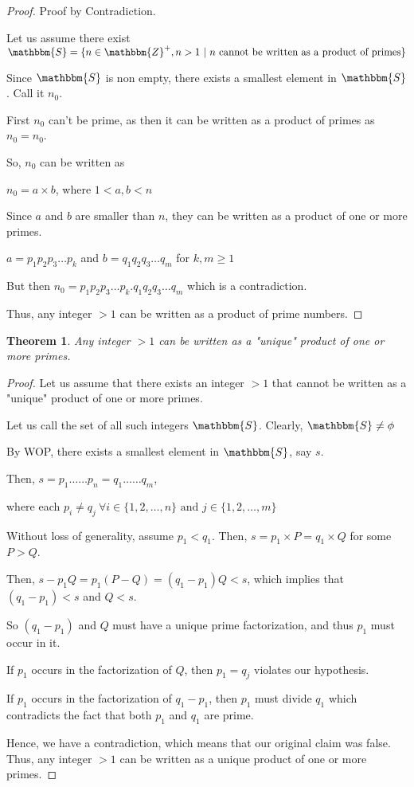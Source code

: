 \documentclass[14pt]{extarticle}
\newcommand{\Z}{\mathbbm{Z}}
\newcommand{\Sset}{\mathbbm{S}}
\newtheorem{theorem}{Theorem}
\begin{document}
\begin{proof}
    Proof by Contradiction.

    Let us assume there exist \\ 
    $\Sset = \{ n\in \Z^+, n > 1 \ | \ n \text{ cannot be written as a product of primes} \}$

    Since $\Sset$ is non empty, there exists a smallest element in $\Sset$. Call it $n_0$.

    First $n_0$ can't be prime, as then it can be written as a product of primes as $n_0 = n_0$.

    So, $n_0$ can be written as

    $n_0 = a\times b$, where $1 < a, b < n$

    Since $a$ and $b$ are smaller than $n$, they can be written as a product of one or more primes.

    $a = p_1p_2p_3\dots p_k$ and $b = q_1q_2q_3\dots q_m$ for $k,m \geq 1$

    But then $n_0 = p_1p_2p_3\dots p_k.q_1q_2q_3\dots q_m$ which is a contradiction.

    Thus, any integer $> 1$ can be written as a product of prime numbers.
\end{proof}

\begin{theorem}
    Any integer $> 1$ can be written as a "unique" product of one or more primes.
\end{theorem}

\begin{proof}
    Let us assume that there exists an integer $ > 1$ that cannot be written as a "unique" product of one or more primes.

    Let us call the set of all such integers $\Sset$.
    Clearly, $\Sset \neq \phi$

    By WOP, there exists a smallest element in $\Sset$, say $s$.

    Then, $s = p_1\dots\dots p_n = q_1\dots\dots q_m$, 
    
    where each $p_i \neq q_j \ \forall i \in \{1, 2, \dots, n\} \text{ and } j \in \{1, 2, \dots, m\}$

    Without loss of generality, assume $p_1 < q_1$.
    Then, $s = p_1 \times P = q_1 \times Q$ for some $P > Q$.

    Then, $s - p_1Q = p_1 (P-Q) = (q_1 - p_1)Q < s$, which implies that $(q_1 - p_1) < s$ and $Q < s$.

    So $(q_1 - p_1)$ and $Q$ must have a unique prime factorization, and thus $p_1$ must occur in it.

    If $p_1$ occurs in the factorization of $Q$, then $p_1 = q_j$ violates our hypothesis.

    If $p_1$ occurs in the factorization of $q_1-p_1$, then $p_1$ must divide $q_1$ which contradicts the fact that both $p_1$ and $q_1$ are prime.

    Hence, we have a contradiction, which means that our original claim was false.
    Thus, any integer $> 1$ can be written as a unique product of one or more primes.
\end{proof}
\end{document}
